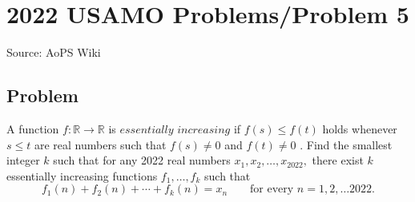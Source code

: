 \documentclass[12pt]{article}
\begin{document}
\section*{{2022 USAMO Problems/Problem 5}}
Source: AoPS Wiki

\subsection*{Problem}
A function $f: \mathbb{R}\to \mathbb{R}$ is $\textit{essentially increasing}$ if $f(s)\leq f(t)$ holds whenever $s\leq t$ are real numbers such that $f(s)\neq 0$ and $f(t)\neq 0$ . Find the smallest integer $k$ such that for any 2022 real numbers $x_1,x_2,\ldots , x_{2022},$ there exist $k$ essentially increasing functions $f_1,\ldots, f_k$ such that \[f_1(n) + f_2(n) + \cdots + f_k(n) = x_n\qquad \text{for every } n= 1,2,\ldots 2022.\]
\end{document}
